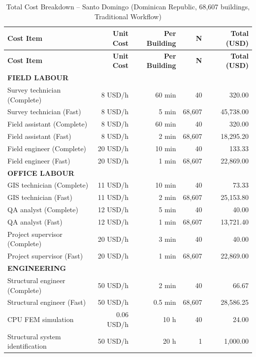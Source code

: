 \begin{longtable}{lrrrr}
\caption{Total Cost Breakdown – Santo Domingo (Dominican Republic, 68,607 buildings, Traditional Workflow)} \\
\hline
\textbf{Cost Item} & \textbf{Unit Cost} & \textbf{Per Building} & \textbf{N} & \textbf{Total (USD)} \\
\hline
\endfirsthead

\hline
\textbf{Cost Item} & \textbf{Unit Cost} & \textbf{Per Building} & \textbf{N} & \textbf{Total (USD)} \\
\hline
\endhead

\multicolumn{5}{l}{\textbf{FIELD LABOUR}} \\

Survey technician (Complete) & 8 USD/h & 60 min & 40 & 320.00 \\
Survey technician (Fast) & 8 USD/h & 5 min & 68,607 & 45,738.00 \\
Field assistant (Complete) & 8 USD/h & 60 min & 40 & 320.00 \\
Field assistant (Fast) & 8 USD/h & 2 min & 68,607 & 18,295.20 \\
Field engineer (Complete) & 20 USD/h & 10 min & 40 & 133.33 \\
Field engineer (Fast) & 20 USD/h & 1 min & 68,607 & 22,869.00 \\
\hline

\multicolumn{5}{l}{\textbf{OFFICE LABOUR}} \\

GIS technician (Complete) & 11 USD/h & 10 min & 40 & 73.33 \\
GIS technician (Fast) & 11 USD/h & 2 min & 68,607 & 25,153.80 \\
QA analyst (Complete) & 12 USD/h & 5 min & 40 & 40.00 \\
QA analyst (Fast) & 12 USD/h & 1 min & 68,607 & 13,721.40 \\
Project supervisor (Complete) & 20 USD/h & 3 min & 40 & 40.00 \\
Project supervisor (Fast) & 20 USD/h & 1 min & 68,607 & 22,869.00 \\
\hline

\multicolumn{5}{l}{\textbf{ENGINEERING}} \\

Structural engineer (Complete) & 50 USD/h & 2 min & 40 & 66.67 \\
Structural engineer (Fast) & 50 USD/h & 0.5 min & 68,607 & 28,586.25 \\
CPU FEM simulation & 0.06 USD/h & 10 h & 40 & 24.00 \\
Structural system identification & 50 USD/h & 20 h & 1 & 1,000.00 \\
\hline


\end{longtable}
